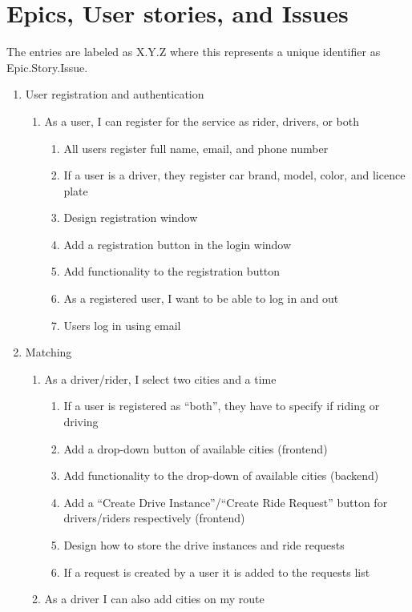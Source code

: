 \documentclass{article}
\begin{document}
\newpage
\section{Epics, User stories, and Issues}
The entries are labeled as X.Y.Z where this represents a unique identifier as Epic.Story.Issue.
\begin{enumerate}
  
  \item User registration and authentication
  \begin{enumerate}
    \item As a user, I can register for the service as rider, drivers, or both
    \begin{enumerate}
        \item All users register full name, email, and phone number
        \item If a user is a driver, they register car brand, model, color, and licence plate
        \item Design registration window
        \item Add a registration button in the login window
        \item Add functionality to the registration button
        \item As a registered user, I want to be able to log in and out
        \item Users log in using email
    \end{enumerate}
  \end{enumerate}
  
  \item Matching
  \begin{enumerate}
      \item As a driver/rider, I select two cities and a time
      \begin{enumerate}
          \item If a user is registered as “both”, they have to specify if riding or driving
          \item Add a drop-down button of available cities (frontend)
          \item Add functionality to the drop-down of available cities (backend)
          \item Add a “Create Drive Instance”/“Create Ride Request” button for drivers/riders respectively (frontend)
          \item Design how to store the drive instances and ride requests
          \item If a request is created by a user it is added to the requests list
      \end{enumerate}
      \item As a driver I can also add cities on my route
  \end{enumerate}
  

\end{enumerate}
\end{document}
